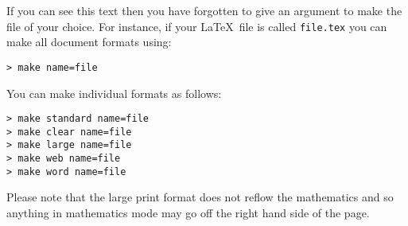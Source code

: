 \documentclass{article}
\begin{document}
If you can see this text then you have forgotten to give an argument to make the file of your choice. For instance, if your \LaTeX~file is called \verb=file.tex= you can make all document formats using:
\begin{verbatim}
> make name=file
\end{verbatim}
You can make individual formats as follows:
\begin{verbatim}
> make standard name=file
> make clear name=file
> make large name=file
> make web name=file
> make word name=file
\end{verbatim}
Please note that the large print format does not reflow the mathematics and so anything in mathematics mode may go off the right hand side of the page. 
\end{document}
